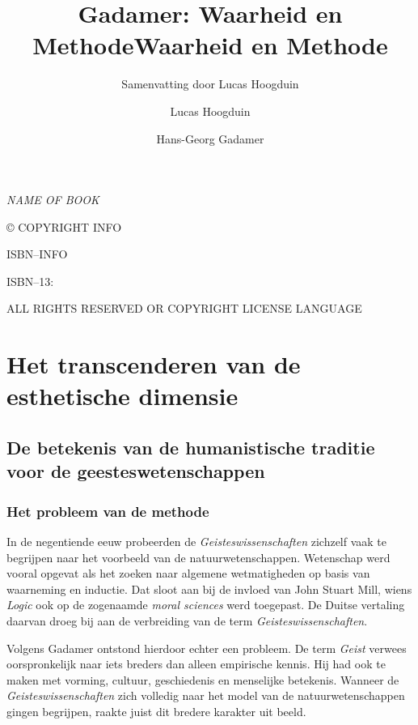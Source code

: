 \documentclass[11pt,twoside,openright]{memoir}
\title{Gadamer: Waarheid en Methode}
\author{Lucas Hoogduin}
\date{} %
\author{Hans-Georg Gadamer}
\title{Waarheid en Methode}
\subtitle{Samenvatting door Lucas Hoogduin}
\date{}
\makeatletter
\def\@subtitle{}
\def\maketitle{%
  \null
  \thispagestyle{empty}%
  \vfill
  \begin{center}\leavevmode
    \normalfont
    {\LARGE\raggedleft \@author\par}%
    \hrulefill\par
    {\huge\raggedright \@title\par}%
    \vskip 1cm
    {\Large\raggedright \@subtitle\par}%
  \end{center}%
  \vfill
  \null
  \cleardoublepage
  }
\makeatother
\begin{document}
\let\cleardoublepage\clearpage


\maketitle






\frontmatter

\null\vfill

\begin{flushleft}
\textit{NAME OF BOOK}


© COPYRIGHT INFO


ISBN--INFO

ISBN--13: 
\bigskip





ALL RIGHTS RESERVED OR COPYRIGHT LICENSE LANGUAGE




\end{flushleft}
\let\cleardoublepage\clearpage

\mainmatter
\sloppy

\chapter{Het transcenderen van de esthetische dimensie}

\section{De betekenis van de humanistische traditie voor de geesteswetenschappen}

\subsection{Het probleem van de methode}

In de negentiende eeuw probeerden de \textit{Geisteswissenschaften} zichzelf vaak te begrijpen naar het voorbeeld van de natuurwetenschappen. Wetenschap werd vooral opgevat als het zoeken naar algemene wetmatigheden op basis van waarneming en inductie. Dat sloot aan bij de invloed van John Stuart Mill, wiens \textit{Logic} ook op de zogenaamde \textit{moral sciences} werd toegepast. De Duitse vertaling daarvan droeg bij aan de verbreiding van de term \textit{Geisteswissenschaften}.

Volgens Gadamer ontstond hierdoor echter een probleem. De term \textit{Geist} verwees oorspronkelijk naar iets breders dan alleen empirische kennis. Hij had ook te maken met vorming, cultuur, geschiedenis en menselijke betekenis. Wanneer de \textit{Geisteswissenschaften} zich volledig naar het model van de natuurwetenschappen gingen begrijpen, raakte juist dit bredere karakter uit beeld.
\end{document}
